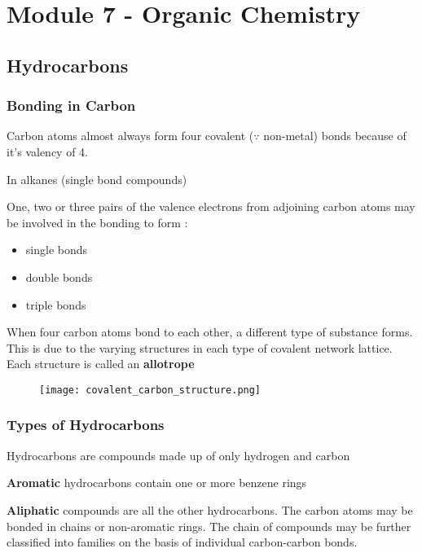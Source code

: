 
\chapter{Module 7 - Organic Chemistry}

\section{Hydrocarbons} \label{02/05/2025}

	\subsection{Bonding in Carbon}
	
		Carbon atoms almost always form four covalent ($\because$ non-metal) bonds because of it's valency of 4.

		In alkanes (single bond compounds)

		One, two or three pairs of the valence electrons from adjoining carbon atoms may be involved in the bonding to form :

			\begin{itemize}
				\item single bonds 
				\item double bonds 
				\item triple bonds 
			\end{itemize}

		When four carbon atoms bond to each other, a different type of substance forms. This is due to the varying structures in each type of covalent network lattice. Each structure is called an \textbf{allotrope}

	\begin{figure}[H]
		\centering
		\texttt{[image: covalent\_carbon\_structure.png]}
	\end{figure}

	\subsection{Types of Hydrocarbons}
	
		Hydrocarbons are compounds made up of only hydrogen and carbon

		\textbf{Aromatic} hydrocarbons contain one or more benzene rings

		\textbf{Aliphatic} compounds are all the other hydrocarbons. The carbon atoms may be bonded in chains or non-aromatic rings. The chain of compounds may be further classified into families on the basis of individual carbon-carbon bonds.

